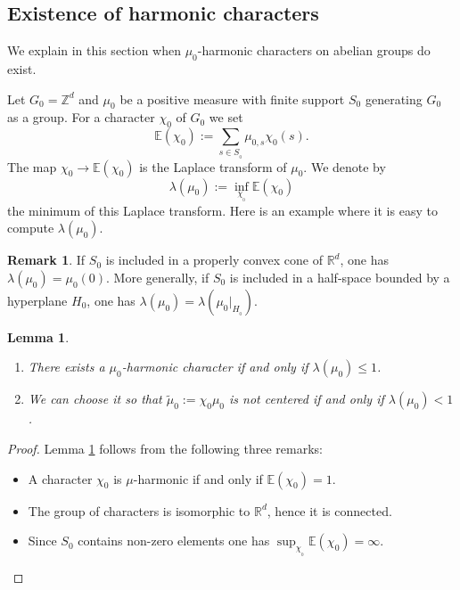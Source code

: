 \documentclass[JEP,XML,SOM,Unicode]{cedram}
\newenvironment{enumeratea}
{\bgroup\def\theenumi{\alph{enumi}}\begin{enumerate}}
{\end{enumerate}\egroup}
\newtheorem{Lem}[Thm]{Lemma}
\theoremstyle{definition}
\newtheorem{Rem}[Thm]{Remark}
\newcommand{\m}[1]{\mathbb{ #1}}
\let\la\lambda
\let\bq\relax
\let\eq\relax
\let\ra\to
\begin{document}
\subsection{Existence of harmonic characters}
\label{secharcha}

\bq
We explain in this section when $\mu_0$\nobreakdash-har\-monic characters
on abelian groups do exist.
\eq

Let $G_0=\m Z^d$ and $\mu_0$ be a
positive measure with finite support $S_0$ generating $G_0$ as a group.
For a character $\chi_0$ of $G_0$ we set
\[
\m E(\chi_0):=\sum_{s\in S_{_0}}\mu_{0,s}\chi_0(s).
\]
The map $\chi_0\ra\m E(\chi_0)$ is the Laplace transform of $\mu_0$.
We denote by
\begin{equation}
\label{eqnlamuoo}
\la(\mu_0):=\inf_{\chi_{_0}} \m E(\chi_0)
\end{equation}
the minimum of this Laplace transform.
Here is an example where it is easy to compute $\la(\mu_0)$.

\begin{Rem}
\label{remlammuo}
If $S_0$ is included in a properly convex cone of $\m R^d$, one has \hbox{$\la(\mu_0)=\mu_0(0)$}.
More generally, if $S_0$ is included in a half-space bounded by a hyperplane $H_0$, one has $\la(\mu_0)=\la(\mu_0|_{H_{_0}})$.
\end{Rem}

\skpt
\begin{Lem}
\label{lemharcha}
\begin{enumeratea}
\item\label{lemharchaa}
There exists a $\mu_0$-harmonic character if and only if
$\la(\mu_0)\leq 1$.

\item\label{lemharchab}
We can choose it so that $\widetilde{\mu}_0:=\chi_0\mu_0$ is not centered if and only if
$\la(\mu_0)< 1$.
\end{enumeratea}
\end{Lem}

\begin{proof} Lemma \ref{lemharcha} follows from the following three remarks:
\begin{itemize}
\item
A character $\chi_0$ is $\mu$-harmonic if and only if $\m E(\chi_0)=1$.\item
The group of characters is isomorphic to $\m R^d$, hence it is connected.
\item
Since $S_0$ contains non-zero elements one has $\sup_{\chi_{_0}}\m E(\chi_0)=\infty$.\qedhere
\end{itemize}
\end{proof}
\end{document}
